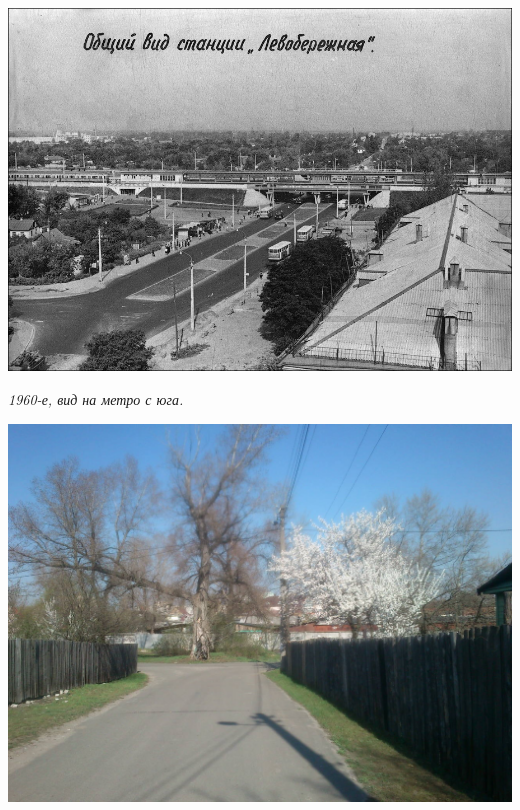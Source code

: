 \begin{center}
\includegraphics[width=\linewidth]{chast-gorodki/cherto/8865d6c145cea5226cd9f1a60f599465.jpg}

\textit{1960-е, вид на метро с юга.}
\end{center}
\vspace*{\fill}
\newpage
\vspace*{\fill}
\begin{center}
\includegraphics[width=\linewidth]{chast-gorodki/cherto/s_niksl_DSC_0044.JPG}
\end{center}

